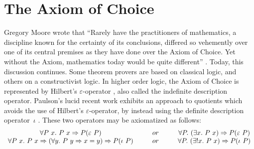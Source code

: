 \documentclass[envcountsame,runningheads]{llncs}
\begin{document}
%
\section{The Axiom of Choice}
%
\label{axiomofchoice}

Gregory Moore wrote that ``Rarely have the practitioners of mathematics,
a discipline known for the certainty of its conclusions, differed so vehemently
over one of its central premises as they have done over the Axiom of Choice.
Yet without the Axiom, mathematics today would be quite different''
\cite{Moore82}.
Today,
this discussion continues.
Some theorem provers are based on classical logic,
and others on
a constructivist logic.
In higher order logic, the Axiom of Choice is represented
by Hilbert's $\varepsilon$-operator \cite[\S4.4]{Lei69},
also called the indefinite description
operator.
  Paulson's lucid recent work \cite{LP04} exhibits an approach to quotients
which avoids the use of Hilbert's $\varepsilon$-operator,
by
instead
using the definite description operator~$\iota$
\cite[\S 5.10]{NiPaWe02}.
These two operators may be axiomatized as follows:
%
$$\begin{array}{cp{3mm}cp{3mm}c}
\forall P\ x.\ P\ x \Rightarrow P (\varepsilon \ P) & & or & &
\forall P.\ (\exists x.\ P\ x) \Rightarrow P (\varepsilon \ P)
\\
\forall P\ x.\ P\ x \Rightarrow (\forall y.\ P\ y \Rightarrow x = y) \Rightarrow P (\iota \ P) & & or & &
\forall P.\ (\exists ! x.\ P\ x) \Rightarrow P (\iota \ P)
\end{array}
$$
\end{document}
